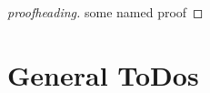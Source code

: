 \blindtext

\begin{proof}[proofheading]
 some named proof 
\end{proof}













\section{General ToDos}
\label{sec:todos}





